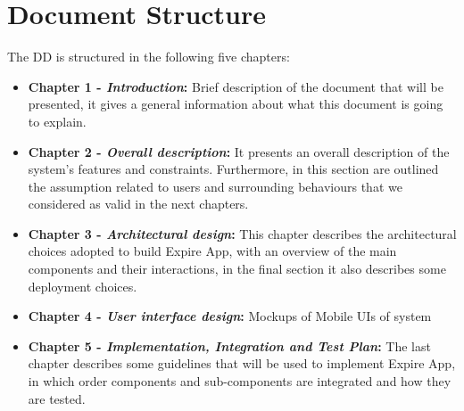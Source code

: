 \section{Document Structure}

The DD is structured in the following five chapters:
\begin{itemize}
\item \textbf{Chapter 1 -  \textit{Introduction}:}
Brief description of the document that will be presented, it gives a general information about what this document is going to explain.
\item \textbf{Chapter 2 -  \textit{Overall description}:}
It presents an overall description of the system’s features and constraints. Furthermore, in this section are outlined the assumption related to users and surrounding behaviours that we considered as valid in the next chapters.
\item \textbf{Chapter 3 -  \textit{Architectural design}:} 
This chapter describes the architectural choices adopted to build Expire App, with an overview of the
main components and their interactions, in the final section it also describes some deployment choices.
\item \textbf{Chapter 4 -  \textit{User interface design}:}
Mockups of Mobile UIs of system
\item \textbf{Chapter 5 -  \textit{Implementation, Integration and Test Plan}:}
The last chapter describes some guidelines that will be used to implement
Expire App, in which order components and sub-components are integrated and how they are tested.
\end{itemize}
